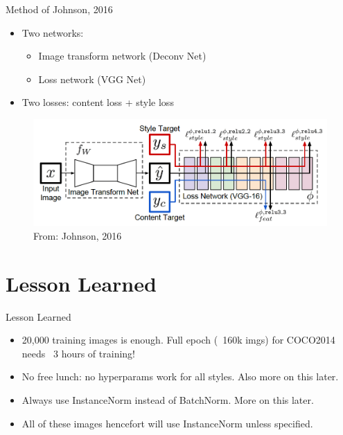 \documentclass{beamer}
\begin{document}
    \begin{frame}{Method of Johnson, 2016}

    \begin{itemize}
        \item Two networks:
            \begin{itemize}
                \item Image transform network (Deconv Net)
                \item Loss network (VGG Net)
            \end{itemize}
        \item Two losses: content loss + style loss
    \end{itemize}

    \begin{figure}
        \includegraphics[width=\textwidth]{arch}
        \caption{\label{fig:arch}From: Johnson, 2016}
    \end{figure}

    \end{frame}

    \section{Lesson Learned}

    \begin{frame}{Lesson Learned}

    \begin{itemize}
        \item 20,000 training images is enough. Full epoch (~160k imgs) for COCO2014 needs ~3 hours of training!
        \item No free lunch: no hyperparams work for all styles. Also more on this later.
        \item Always use InstanceNorm instead of BatchNorm. More on this later.
        \item All of these images hencefort will use InstanceNorm unless specified.
    \end{itemize}

    \end{frame}
\end{document}

